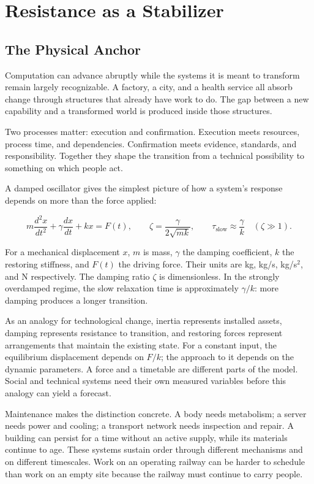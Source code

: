 \section{Resistance as a Stabilizer}

\subsection{The Physical Anchor}

Computation can advance abruptly while the systems it is meant to transform remain largely recognizable. A factory, a city, and a health service all absorb change through structures that already have work to do. The gap between a new capability and a transformed world is produced inside those structures.

Two processes matter: execution and confirmation. Execution meets resources, process time, and dependencies. Confirmation meets evidence, standards, and responsibility. Together they shape the transition from a technical possibility to something on which people act.

A damped oscillator gives the simplest picture of how a system's response depends on more than the force applied:

\begin{equation}
m\frac{d^2x}{dt^2}+\gamma\frac{dx}{dt}+kx=F(t),
\qquad
\zeta=\frac{\gamma}{2\sqrt{mk}},
\qquad
\tau_{\mathrm{slow}}\approx\frac{\gamma}{k}\quad(\zeta\gg1).
\end{equation}

For a mechanical displacement $x$, $m$ is mass, $\gamma$ the damping coefficient, $k$ the restoring stiffness, and $F(t)$ the driving force. Their units are kg, kg/s, kg/s$^2$, and N respectively. The damping ratio $\zeta$ is dimensionless. In the strongly overdamped regime, the slow relaxation time is approximately $\gamma/k$: more damping produces a longer transition.

As an analogy for technological change, inertia represents installed assets, damping represents resistance to transition, and restoring forces represent arrangements that maintain the existing state. For a constant input, the equilibrium displacement depends on $F/k$; the approach to it depends on the dynamic parameters. A force and a timetable are different parts of the model. Social and technical systems need their own measured variables before this analogy can yield a forecast.

Maintenance makes the distinction concrete. A body needs metabolism; a server needs power and cooling; a transport network needs inspection and repair. A building can persist for a time without an active supply, while its materials continue to age. These systems sustain order through different mechanisms and on different timescales. Work on an operating railway can be harder to schedule than work on an empty site because the railway must continue to carry people.


